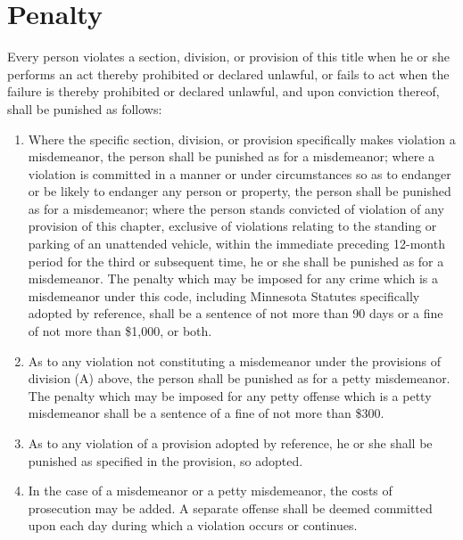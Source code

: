 \section{Penalty}
Every person violates a section, division, or provision of this title when he or she performs an act thereby prohibited or declared unlawful, or fails to act when the failure is thereby prohibited or declared unlawful, and upon conviction thereof, shall be punished as follows:
\begin{enumerate}[{\indent}A)]
    \item Where the specific section, division, or provision specifically makes violation a misdemeanor, the person shall be punished as for a misdemeanor; where a violation is committed in a manner or under circumstances so as to endanger or be likely to endanger any person or property, the person shall be punished as for a misdemeanor; where the person stands convicted of violation of any provision of this chapter, exclusive of violations relating to the standing or parking of an unattended vehicle, within the immediate preceding 12-month period for the third or subsequent time, he or she shall be punished as for a misdemeanor.  The penalty which may be imposed for any crime which is a misdemeanor under this code, including Minnesota Statutes specifically adopted by reference, shall be a sentence of not more than 90 days or a fine of not more than \$1,000, or both.
    \item As to any violation not constituting a misdemeanor under the provisions of division (A) above,  the person shall be punished as for a petty misdemeanor.  The penalty which may be imposed for any petty offense which is a petty misdemeanor shall be a sentence of a fine of not more than \$300.
    \item As to any violation of a provision adopted by reference, he or she shall be punished as specified in the provision, so adopted.
    \item In the case of a misdemeanor or a petty misdemeanor, the costs of prosecution may be added.  A separate offense shall be deemed committed upon each day during which a violation occurs or continues.
\end{enumerate}
